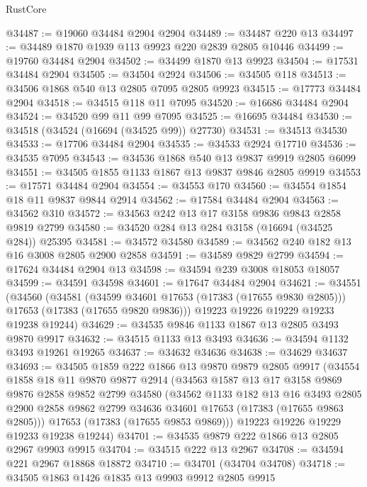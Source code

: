 \begin{lexlean}{RustCore}
\begin{coremodule}
@34487 := @19060 @34484 @2904 @2904
@34489 := @34487 @220 @13
@34497 := @34489 @1870 @1939 @113 @9923 @220 @2839 @2805 @10446
@34499 := @19760 @34484 @2904
@34502 := @34499 @1870 @13 @9923
@34504 := @17531 @34484 @2904
@34505 := @34504 @2924
@34506 := @34505 @118
@34513 := @34506 @1868 @540 @13 @2805 @7095 @2805 @9923
@34515 := @17773 @34484 @2904
@34518 := @34515 @118 @11 @7095
@34520 := @16686 @34484 @2904
@34524 := @34520 @99 @11 @99 @7095
@34525 := @16695 @34484
@34530 := @34518 (@34524 (@16694 (@34525 @99)) @27730)
@34531 := @34513 @34530
@34533 := @17706 @34484 @2904
@34535 := @34533 @2924 @17710
@34536 := @34535 @7095
@34543 := @34536 @1868 @540 @13 @9837 @9919 @2805 @6099
@34551 := @34505 @1855 @1133 @1867 @13 @9837 @9846 @2805 @9919
@34553 := @17571 @34484 @2904
@34554 := @34553 @170
@34560 := @34554 @1854 @18 @11 @9837 @9844 @2914
@34562 := @17584 @34484 @2904
@34563 := @34562 @310
@34572 := @34563 @242 @13 @17 @3158 @9836 @9843 @2858 @9819 @2799
@34580 := @34520 @284 @13 @284 @3158 (@16694 (@34525 @284)) @25395
@34581 := @34572 @34580
@34589 := @34562 @240 @182 @13 @16 @3008 @2805 @2900 @2858
@34591 := @34589 @9829 @2799
@34594 := @17624 @34484 @2904 @13
@34598 := @34594 @239 @3008 @18053 @18057
@34599 := @34591 @34598
@34601 := @17647 @34484 @2904
@34621 := @34551
    (@34560
      (@34581
        (@34599 @34601 @17653 (@17383 (@17655 @9830 @2805)))
        @17653
        (@17383 (@17655 @9820 @9836)))
      @19223
      @19226
      @19229
      @19233
      @19238
      @19244)
@34629 := @34535 @9846 @1133 @1867 @13 @2805 @3493 @9870 @9917
@34632 := @34515 @1133 @13 @3493
@34636 := @34594 @1132 @3493 @19261 @19265
@34637 := @34632 @34636
@34638 := @34629 @34637
@34693 := @34505
    @1859
    @222
    @1866
    @13
    @9870
    @9879
    @2805
    @9917
    (@34554
      @1858
      @18
      @11
      @9870
      @9877
      @2914
      (@34563
        @1587
        @13
        @17
        @3158
        @9869
        @9876
        @2858
        @9852
        @2799
        @34580
        (@34562
          @1133
          @182
          @13
          @16
          @3493
          @2805
          @2900
          @2858
          @9862
          @2799
          @34636
          @34601
          @17653
          (@17383 (@17655 @9863 @2805)))
        @17653
        (@17383 (@17655 @9853 @9869)))
      @19223
      @19226
      @19229
      @19233
      @19238
      @19244)
@34701 := @34535 @9879 @222 @1866 @13 @2805 @2967 @9903 @9915
@34704 := @34515 @222 @13 @2967
@34708 := @34594 @221 @2967 @18868 @18872
@34710 := @34701 (@34704 @34708)
@34718 := @34505 @1863 @1426 @1835 @13 @9903 @9912 @2805 @9915

\end{coremodule}
\end{lexlean}
